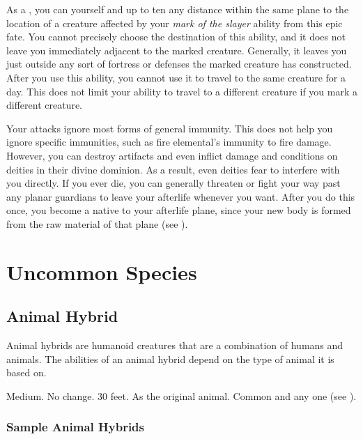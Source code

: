              As a , you can  yourself and up to ten  any distance within the same plane to the location of a creature affected by your \textit{mark of the slayer} ability from this epic fate.
            You cannot precisely choose the destination of this ability, and it does not leave you immediately adjacent to the marked creature.
            Generally, it leaves you just outside any sort of fortress or defenses the marked creature has constructed.
            After you use this ability, you cannot use it to travel to the same creature for a day.
            This does not limit your ability to travel to a different creature if you mark a different creature.

            Your attacks ignore most forms of general immunity.
            This does not help you ignore specific immunities, such as fire elemental's immunity to fire damage.
            However, you can destroy artifacts and even inflict damage and conditions on deities in their divine dominion.
            As a result, even deities fear to interfere with you directly.
            If you ever die, you can generally threaten or fight your way past any planar guardians to leave your afterlife whenever you want.
            After you do this once, you become a  native to your afterlife plane, since your new body is formed from the raw material of that plane (see ).

\section{Uncommon Species}\label{Uncommon Species}

    \subsection{Animal Hybrid}
        Animal hybrids are humanoid creatures that are a combination of humans and animals.
        The abilities of an animal hybrid depend on the type of animal it is based on.

         Medium.
         No change.
         30 feet.
         As the original animal.
         Common and any one  (see ).

        \subsubsection{Sample Animal Hybrids}

